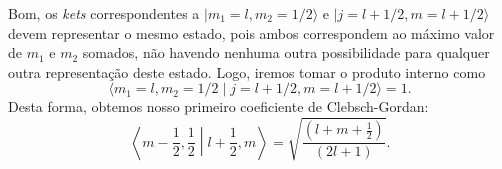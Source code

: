\documentclass{article}
\newcommand{\ket}[1]{\mid\!\! #1 \rangle}
\newcommand{\braket}[2]{\langle #1 \!\mid\! #2 \rangle}
\newcommand{\abraket}[2]{\left\langle #1 \middle| #2 \right\rangle}
\begin{document}
Bom, os \textit{kets} correspondentes a $\ket{m_1 = l,m_2 = 1 \slash 2}$ e $\ket{j = l + 1 \slash 2, m = l + 1 \slash 2}$ devem representar o mesmo estado, pois ambos
correspondem ao máximo valor de $m_1$ e $m_2$ somados, não havendo nenhuma outra possibilidade para qualquer outra representação deste estado. Logo, iremos tomar o
produto interno como
\begin{equation}
 \braket{m_1 = l,m_2 = 1 \slash 2}{j = l + 1 \slash 2, m = l + 1 \slash 2} = 1\mathrm{.}
\end{equation}
Desta forma, obtemos nosso primeiro coeficiente de Clebsch-Gordan:
\begin{equation}
 \abraket{m - \frac{1}{2},\frac{1}{2}}{l + \frac{1}{2},m} =
 \sqrt{\frac{\left(l + m + \frac{1}{2}\right)}{\left(2l + 1\right)}}\mathrm{.}
\end{equation}
\end{document}
